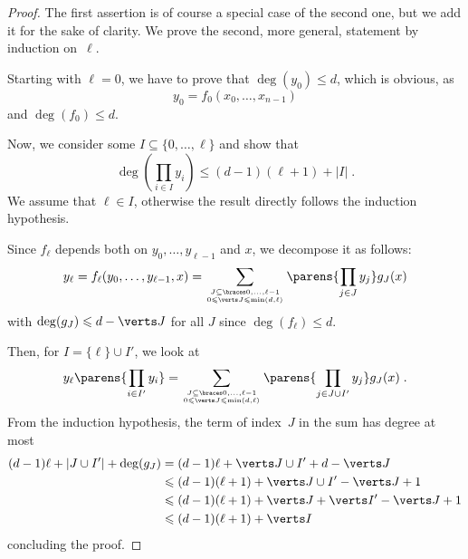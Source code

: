\begin{proof}
The first assertion is of course a special case of the second one, but we add it for the sake of clarity.
We prove the second, more general, statement by induction on~$\ell$.

Starting with $\ell=0$, we have to prove that $\deg(y_0)\leqslant d$, which is obvious, as
\begin{equation*}
    y_0=f_0(x_0,\dots,x_{n-1})
\end{equation*}
and $\deg(f_0) \le d$.

Now, we consider some $I \subseteq \{0, \ldots, \ell\}$ and show that
\begin{equation*}
    \deg(\prod_{i \in I} y_i)\leqslant (d-1)(\ell+1) +|I| \;.
\end{equation*}
We assume that $\ell \in I$, otherwise the result directly follows the induction hypothesis.

Since $f_\ell$ depends both on $y_0, \ldots, y_{\ell-1}$ and $x$, we decompose it as follows:
\begin{equation*}
    y_\ell=f_\ell(y_0, \ldots, y_{\ell-1},x) = \sum_{\tower{J \subseteq \set{0, \ldots, \ell-1}}{0 \leqslant \abs{J} \leqslant \min(d,\ell)}} \parens{\prod_{j \in J} y_j} g_J(x)
\end{equation*}
with $\deg(g_J) \leqslant d - \abs{J}$ for all $J$ since $\deg(f_\ell) \leqslant d$.

Then, for $I = \{\ell\} \cup I'$, we look at
\begin{equation*}
    y_\ell \parens{\prod_{i \in I'} y_i} = \sum_{\tower{J \subseteq \set{0, \ldots, \ell-1}}{0 \leqslant \abs{J} \leqslant \min(d,\ell)}} \parens{\prod_{j \in J \cup I^\prime} y_j}  g_J(x)\;.
\end{equation*}
From the induction hypothesis, the term of index~$J$ in the sum has degree at most
\begin{align*}
(d-1)\ell+|J \cup I'| + \deg(g_J) & = (d-1) \ell + \abs{J \cup I^\prime} + d - \abs{J} \\
                                  & \leqslant (d-1) (\ell+1) + \abs{J \cup I^\prime} - \abs{J} +1\\
                                  & \leqslant (d-1) (\ell+1) + \abs{J} + \abs{I^\prime} - \abs{J} + 1\\
                                  & \leqslant (d-1) (\ell+1) + \abs{I}
\end{align*}
concluding the proof.
\end{proof}

